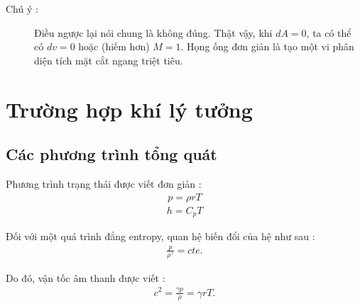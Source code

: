 \documentclass[DONG_CHAY_NEN_DUOC.tex]{subfiles}
\begin{document}
\begin{description}
	\item[Chú ý :] Điều ngược lại nói chung là không đúng. Thật vậy, khi $dA = 0$, ta có thể có $dv=0$ hoặc (hiếm hơn) $M = 1$. Họng ống đơn giản là tạo một vi phân diện tích mặt cắt ngang triệt tiêu.
\end{description}

\section{Trường hợp khí lý tưởng}
\subsection{Các phương trình tổng quát}

Phương trình trạng thái được viết đơn giản :
\begin{equation}
	\begin{aligned}
		p = \rho rT
	\end{aligned}
\end{equation}
\begin{equation}
	\begin{aligned}
		h = C_pT
	\end{aligned}
\end{equation}

Đối với một quá trình đẳng entropy, quan hệ biến đổi của hệ như sau :
\begin{equation}
	\begin{aligned}
		\frac{p}{\rho^{\gamma}} =cte.
	\end{aligned}
\end{equation}

Do đó, vận tốc âm thanh được viết :
\begin{equation}
	\begin{aligned}
 		c^2 = \frac{\gamma p}{\rho} = \gamma rT.
	\end{aligned}
\end{equation}
\end{document}
